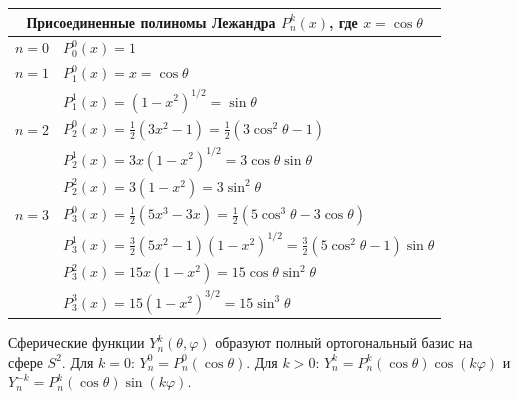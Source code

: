 \documentclass[a4paper,10pt]{article}
\begin{document}
\vspace{0.3cm}
\begin{center}
\renewcommand{\arraystretch}{1.5}
\begin{tabular}{ll}
\hline
\multicolumn{2}{c}{\textbf{Присоединенные полиномы Лежандра $P_n^k(x)$, где $x = \cos\theta$}} \\
\hline
$n=0$ & $P_0^0(x) = 1$ \\
\hline
$n=1$ & $P_1^0(x) = x = \cos\theta$ \\
      & $P_1^1(x) = (1-x^2)^{1/2} = \sin\theta$ \\
\hline
$n=2$ & $P_2^0(x) = \frac{1}{2}(3x^2 - 1) = \frac{1}{2}(3\cos^2\theta - 1)$ \\
      & $P_2^1(x) = 3x(1-x^2)^{1/2} = 3\cos\theta\sin\theta$ \\
      & $P_2^2(x) = 3(1-x^2) = 3\sin^2\theta$ \\
\hline
$n=3$ & $P_3^0(x) = \frac{1}{2}(5x^3 - 3x) = \frac{1}{2}(5\cos^3\theta - 3\cos\theta)$ \\
      & $P_3^1(x) = \frac{3}{2}(5x^2-1)(1-x^2)^{1/2} = \frac{3}{2}(5\cos^2\theta-1)\sin\theta$ \\
      & $P_3^2(x) = 15x(1-x^2) = 15\cos\theta\sin^2\theta$ \\
      & $P_3^3(x) = 15(1-x^2)^{3/2} = 15\sin^3\theta$ \\
\hline
\end{tabular}
\end{center}

Сферические функции $Y_n^k(\theta, \varphi)$ образуют полный ортогональный базис на сфере $S^2$. Для $k=0$: $Y_n^0 = P_n^0(\cos\theta)$. Для $k > 0$: $Y_n^k = P_n^k(\cos\theta)\cos(k\varphi)$ и $Y_n^{-k} = P_n^k(\cos\theta)\sin(k\varphi)$.
\end{document}
